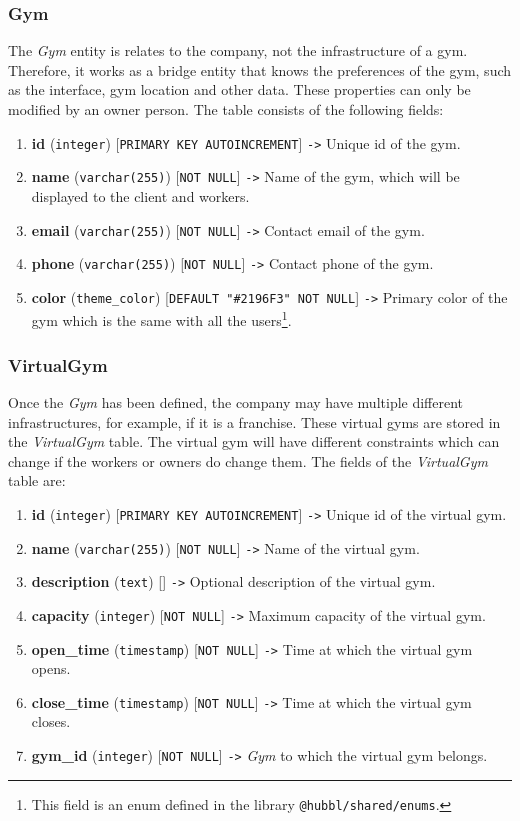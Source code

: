 \documentclass[a4paper, 12pt, oneside]{book}
\begin{document}
\subsubsection{Gym}
The \emph{Gym} entity is relates to the company, not the infrastructure of a gym. Therefore, it works as a bridge entity that knows the preferences of the gym, such as the interface, gym location and other data. These properties can only be modified by an owner person. The table consists of the following fields:
\begin{enumerate}[label = -]
	\item \textbf{id} (\texttt{integer}) [\texttt{PRIMARY KEY AUTOINCREMENT}] \texttt{->} Unique id of the gym.
	\item \textbf{name} (\texttt{varchar(255)}) [\texttt{NOT NULL}] \texttt{->} Name of the gym, which will be displayed to the client and workers.
	\item \textbf{email} (\texttt{varchar(255)}) [\texttt{NOT NULL}] \texttt{->} Contact email of the gym.
	\item \textbf{phone} (\texttt{varchar(255)}) [\texttt{NOT NULL}] \texttt{->} Contact phone of the gym.
	\item \textbf{color} (\texttt{theme\_color}) [\texttt{DEFAULT "\#2196F3" NOT NULL}] \texttt{->} Primary color of the gym which is the same with all the users\footnote{This field is an enum defined in the library \texttt{@hubbl/shared/enums}.}.
\end{enumerate}
\subsubsection{VirtualGym}
Once the \emph{Gym} has been defined, the company may have multiple different infrastructures, for example, if it is a franchise. These virtual gyms are stored in the \emph{VirtualGym} table. The virtual gym will have different constraints which can change if the workers or owners do change them. The fields of the \emph{VirtualGym} table are:
\begin{enumerate}[label = -]
	\item \textbf{id} (\texttt{integer}) [\texttt{PRIMARY KEY AUTOINCREMENT}] \texttt{->} Unique id of the virtual gym.
	\item \textbf{name} (\texttt{varchar(255)}) [\texttt{NOT NULL}] \texttt{->} Name of the virtual gym.
	\item \textbf{description} (\texttt{text}) [] \texttt{->} Optional description of the virtual gym.
	\item \textbf{capacity} (\texttt{integer}) [\texttt{NOT NULL}] \texttt{->} Maximum capacity of the virtual gym.
	\item \textbf{open\_time} (\texttt{timestamp}) [\texttt{NOT NULL}] \texttt{->} Time at which the virtual gym opens.
	\item \textbf{close\_time} (\texttt{timestamp}) [\texttt{NOT NULL}] \texttt{->} Time at which the virtual gym closes.
	\item \textbf{gym\_id} (\texttt{integer}) [\texttt{NOT NULL}] \texttt{->} \emph{Gym} to which the virtual gym belongs.
\end{enumerate}
\end{document}
